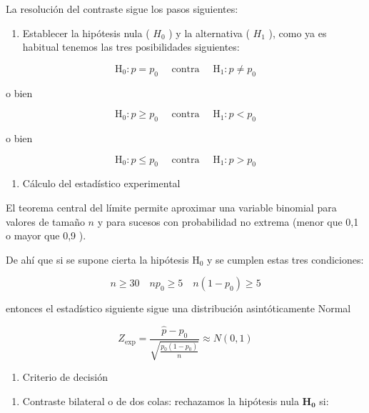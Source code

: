 \documentclass[
]{article}
\providecommand{\tightlist}{%
  \setlength{\itemsep}{0pt}\setlength{\parskip}{0pt}}
\begin{document}
La resolución del contraste sigue los pasos siguientes:

\begin{enumerate}
\def\labelenumi{\arabic{enumi})}
\tightlist
\item
  Establecer la hipótesis nula ( \(H_{0}\) ) y la alternativa ( \(H_{1}\) ), como ya es habitual tenemos las tres posibilidades siguientes:
\end{enumerate}

\[
\mathrm{H}_{0}: p=p_{0} \quad \text { contra } \quad \mathrm{H}_{1}: p \neq p_{0}
\]

o bien

\[
\mathrm{H}_{0}: p \geq p_{0} \quad \text { contra } \quad \mathrm{H}_{1}: p<p_{0}
\]

o bien

\[
\mathrm{H}_{0}: p \leq p_{0} \quad \text { contra } \quad \mathrm{H}_{1}: p>p_{0}
\]

\begin{enumerate}
\def\labelenumi{\arabic{enumi})}
\setcounter{enumi}{1}
\tightlist
\item
  Cálculo del estadístico experimental
\end{enumerate}

El teorema central del límite permite aproximar una variable binomial para valores de tamaño \(n\) y para sucesos con probabilidad no extrema (menor que 0,1 o mayor que 0,9 ).

De ahí que si se supone cierta la hipótesis \(\mathrm{H}_{0}\) y se cumplen estas tres condiciones:

\[
n \geq 30 \quad n p_{0} \geq 5 \quad n\left(1-p_{0}\right) \geq 5
\]

entonces el estadístico siguiente sigue una distribución asintóticamente Normal

\[
Z_{\exp }=\frac{\hat{p}-p_{0}}{\sqrt{\frac{p_{0}\left(1-p_{0}\right)}{n}}} \approx N(0,1)
\]

\begin{enumerate}
\def\labelenumi{\arabic{enumi})}
\setcounter{enumi}{2}
\tightlist
\item
  Criterio de decisión
\end{enumerate}

\begin{enumerate}
\def\labelenumi{\alph{enumi})}
\tightlist
\item
  Contraste bilateral o de dos colas: rechazamos la hipótesis nula \(\mathbf{H}_{\mathbf{0}}\) si:
\end{enumerate}
\end{document}

